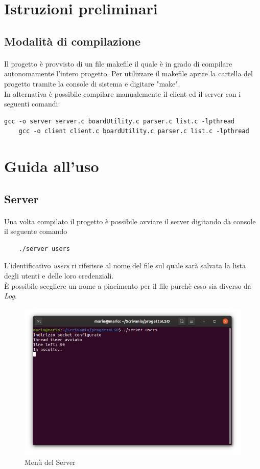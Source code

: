 \documentclass[a4paper]{article}
\begin{document}
\section{Istruzioni preliminari}
\subsection{Modalità di compilazione}
\paragraph{}
Il progetto è provvisto di un file makefile il quale è in grado di compilare autonomamente l'intero progetto.
Per utilizzare il makefile aprire la cartella del progetto tramite la console di sistema e digitare "make".\\
In alternativa è possibile compilare manualemente il client ed il server con i seguenti comandi:
\begin{Verbatim}[fontsize=\small]
    gcc -o server server.c boardUtility.c parser.c list.c -lpthread
    gcc -o client client.c boardUtility.c parser.c list.c -lpthread
\end{Verbatim}
\section{Guida all'uso }
\subsection{Server}
\paragraph{}
Una volta compilato il progetto è possibile avviare il server digitando da console il seguente comando
\begin{verbatim}
    ./server users
\end{verbatim}
L'identificativo \textit{users} ri riferisce al nome del file sul quale sarà salvata la lista degli utenti e delle loro credenziali.\\
È possibile scegliere un nome a piacimento per il file purchè esso sia diverso da \textit{Log}.\\
\begin{figure}[H]
  \includegraphics[width=\textwidth]{Server}
  \caption{Menù del Server}
\end{figure}
\end{document}
